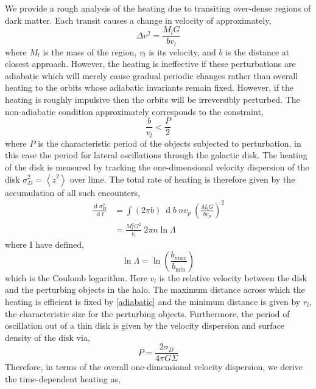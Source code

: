 \documentclass[usenatbib]{mnras}
\renewcommand{\d}[1]{\! \mathrm{d}#1 \:}
\newcommand{\deriv}[2]{\frac{\d{#1}}{\d{#2}}}
\renewcommand{\d}[1]{\ensuremath{\operatorname{d}\!{#1}}}
\begin{document}
We provide a rough analysis of the heating due to transiting over-dense regions of dark matter. Each transit causes a change in velocity of approximately,
\begin{equation}
\Delta v^2 = \frac{M_l G}{b v_l}
\end{equation}
where $M_l$ is the mass of the region, $v_l$ is its velocity, and $b$ is the distance at closest approach. However, the heating is ineffective if these perturbations are adiabatic which will merely cause gradual periodic changes rather than overall heating to the orbits whose adiabatic invariants remain fixed. However, if the heating is roughly impulsive then the orbits will be irreversibly perturbed. The non-adiabatic condition approximately corresponds to the constraint,
\begin{equation} \label{adiabatic}
\frac{b}{v_l} < \frac{P}{2}
\end{equation}
where $P$ is the characteristic period of the objects subjected to perturbation, in this case the period for lateral oscillations through the galactic disk. The heating of the disk is measured by tracking the one-dimensional velocity dispersion of the disk $\sigma_D^2 = \left< \dot{z}^2 \right>$ over lime. The total rate of heating is therefore given by the accumulation of all such encounters,
\begin{subequations}
\begin{align}
\deriv{\sigma_D^2}{t} &= \int (2 \pi b) \: \d{b} \: n v_p \: \left( \frac{M_l G}{b v_p} \right)^2 
\\
& = \frac{M_l^2 G^2}{v_l} \: 2 \pi n \ln{\Lambda}
\end{align}
\end{subequations}
where I have defined,
\begin{equation}
\ln{\Lambda} = \ln{\left( \frac{b_{max}}{b_{\text{min}}} \right)}
\end{equation}
which is the Coulomb logarithm. Here $v_l$ is the relative velocity between the disk and the perturbing objects in the halo. 
The maximum distance across which the heating is efficient is fixed by \ref{adiabatic} and the minimum distance is given by $r_l$, the characteristic size for the perturbing objects. Furthermore, the period of oscillation out of a thin disk is given by the velocity dispersion and surface density of the disk via,
\begin{equation}
P = \frac{2 \sigma_D}{4 \pi G \Sigma}
\end{equation} 
Therefore, in terms of the overall one-dimensional velocity dispersion, we derive the time-dependent heating as,
\end{document}
